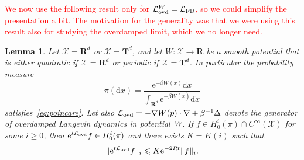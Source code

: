 \documentclass[11pt,a4paper]{article}
\newcommand{\e}{\mathrm{e}}
\newcommand{\real}{\mathbf R}
\newcommand{\torus}{\mathbf T}
\newcommand{\grad}{\nabla}
\renewcommand{\d}{\mathrm d}
\theoremstyle{plain}
\newtheorem{lemma}{Lemma}[section]
\numberwithin{equation}{section}
\renewcommand{\leq}{\leqslant}
\renewcommand{\geq}{\geqslant}
\begin{document}
\textcolor{red}{We now use the following result only for $\mathcal L_{\rm ovd}^{W} = \mathcal L_{\rm FD}$,
so we could simplify the presentation a bit.
The motivation for the generality was that we were using this result also for studying the overdamped limit,
which we no longer need.}
\begin{lemma}
    \label{lemma:overdamped_langevin_decay_derivatives}
    Let $\mathcal X = \real^d$ or $\mathcal X = \torus^d$,
    and let $W: \mathcal X \to \real$ be a smooth potential that is either quadratic if $\mathcal X = \real^d$
    or periodic if $\mathcal X = \torus^d$.
    In particular the probability measure
    \[
        \pi(\d x) = \frac{\e^{- \beta W(x)} \d x}{\int_{\real^d} \e^{-\beta W(\widetilde x)} \d \widetilde x}
    \]
    satisfies~\eqref{eq:poincare}.
    Let also $\mathcal L_{\rm ovd} = - \grad W(p) \cdot \grad + \beta^{-1} \Delta$ denote the generator of overdamped Langevin dynamics in potential~$W$.
    If $f \in H^i_0(\pi) \cap C^{\infty}(\mathcal X)$ for some $i \geq 0$,
    then $\e^{t \mathcal L_{\rm ovd}} f \in H^i_0(\pi)$ and there exists $K = K(i)$ such that
    \[
        \norm*{\e^{t \mathcal L_{\rm ovd}} f}_i \leq K \e^{- 2 R t} \norm*{f}_i.
    \]
\end{lemma}
\end{document}
